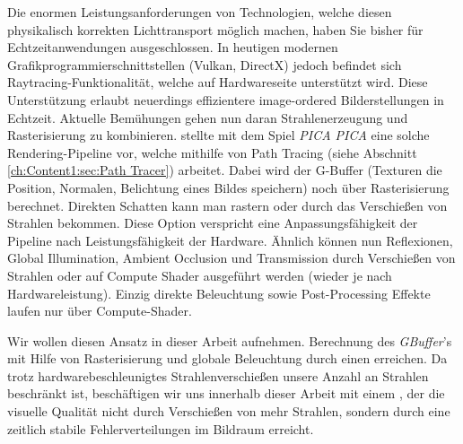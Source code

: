         Die enormen Leistungsanforderungen von Technologien, welche diesen physikalisch korrekten Lichttransport möglich machen, haben Sie bisher für Echtzeitanwendungen ausgeschlossen.
        In heutigen modernen Grafikprogrammierschnittstellen (Vulkan, DirectX) jedoch befindet sich Raytracing-Funktionalität, welche auf Hardwareseite unterstützt wird.
        Diese Unterstützung erlaubt neuerdings effizientere image-ordered Bilderstellungen in Echtzeit.  
        Aktuelle Bemühungen gehen nun daran Strahlenerzeugung und Rasterisierung zu kombinieren. \cite{Barre-Brisebois2019} stellte
        mit dem Spiel \textit{PICA PICA} eine solche Rendering-Pipeline vor, welche mithilfe von Path Tracing
        (siehe Abschnitt \ref{ch:Content1:sec:Path Tracer}) arbeitet. Dabei wird der G-Buffer
        (Texturen die Position, Normalen, Belichtung eines Bildes speichern) noch über Rasterisierung berechnet. Direkten Schatten kann man 
        rastern oder durch das Verschießen von Strahlen bekommen. Diese Option verspricht eine Anpassungsfähigkeit der Pipeline nach Leistungsfähigkeit der Hardware. Ähnlich können nun
        Reflexionen, Global Illumination, Ambient Occlusion und Transmission durch Verschießen von Strahlen oder auf Compute Shader ausgeführt werden (wieder je nach 
        Hardwareleistung). Einzig direkte Beleuchtung sowie Post-Processing Effekte laufen nur über Compute-Shader. \par

        Wir wollen diesen Ansatz in dieser Arbeit aufnehmen. Berechnung des \textit{GBuffer}'s mit Hilfe von Rasterisierung und globale Beleuchtung durch 
        einen  erreichen. Da trotz hardwarebeschleunigtes Strahlenverschießen unsere Anzahl an Strahlen beschränkt ist, 
        beschäftigen wir uns innerhalb dieser Arbeit mit einem , der die visuelle Qualität nicht durch Verschießen von mehr Strahlen, 
        sondern durch eine zeitlich stabile  Fehlerverteilungen im Bildraum erreicht.